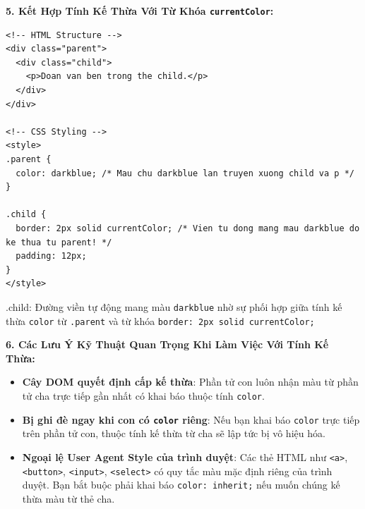 \documentclass[11pt,oneside]{book}
\newcommand{\codeinline}[1]{\textcolor{accentOrange}{\texttt{#1}}}
\begin{document}
\textbf{5. Kết Hợp Tính Kế Thừa Với Từ Khóa \codeinline{currentColor}:}

\begin{codeWindow}
\begin{lstlisting}[language=HTML5]
<!-- HTML Structure -->
<div class="parent">
  <div class="child">
    <p>Doan van ben trong the child.</p>
  </div>
</div>

<!-- CSS Styling -->
<style>
.parent {
  color: darkblue; /* Mau chu darkblue lan truyen xuong child va p */
}

.child {
  border: 2px solid currentColor; /* Vien tu dong mang mau darkblue do ke thua tu parent! */
  padding: 12px;
}
</style>
\end{lstlisting}
\end{codeWindow}

\begin{browserWindow}
\vspace{2pt}
\begin{tcolorbox}[
    enhanced,
    colback=blue!5,
    colframe=blue!80!black,
    arc=6pt, boxrule=1.5pt,
    top=8pt, bottom=8pt, left=10pt, right=10pt,
    fontupper=\sffamily\bfseries\color{blue!80!black}
]
  .child: Đường viền tự động mang màu \codeinline{darkblue} nhờ sự phối hợp giữa tính kế thừa \codeinline{color} từ \codeinline{.parent} và từ khóa \codeinline{border: 2px solid currentColor;}
\end{tcolorbox}
\end{browserWindow}

\textbf{6. Các Lưu Ý Kỹ Thuật Quan Trọng Khi Làm Việc Với Tính Kế Thừa:}

\begin{warnBox}
\begin{itemize}[leftmargin=1.5em, itemsep=3pt, parsep=0pt]
    \item \textbf{Cây DOM quyết định cấp kế thừa}: Phần tử con luôn nhận màu từ phần tử cha trực tiếp gần nhất có khai báo thuộc tính \codeinline{color}.
    \item \textbf{Bị ghi đè ngay khi con có \codeinline{color} riêng}: Nếu bạn khai báo \codeinline{color} trực tiếp trên phần tử con, thuộc tính kế thừa từ cha sẽ lập tức bị vô hiệu hóa.
    \item \textbf{Ngoại lệ User Agent Style của trình duyệt}: Các thẻ HTML như \codeinline{<a>}, \codeinline{<button>}, \codeinline{<input>}, \codeinline{<select>} có quy tắc màu mặc định riêng của trình duyệt. Bạn bắt buộc phải khai báo \codeinline{color: inherit;} nếu muốn chúng kế thừa màu từ thẻ cha.
\end{itemize}
\end{warnBox}
\end{document}
